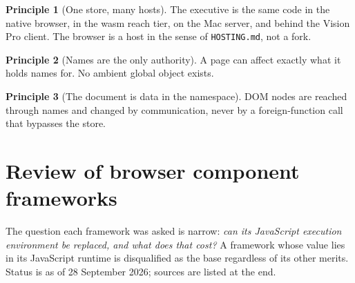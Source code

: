 \documentclass[11pt]{article}
\theoremstyle{definition}
\newtheorem{principle}{Principle}
\theoremstyle{remark}
\newcommand{\code}[1]{\texttt{#1}}
\begin{document}
\begin{principle}[One store, many hosts]
The executive is the same code in the native browser, in the wasm reach tier, on the
Mac server, and behind the Vision Pro client. The browser is a host in the sense of
\code{HOSTING.md}, not a fork.
\end{principle}

\begin{principle}[Names are the only authority]
A page can affect exactly what it holds names for. No ambient global object exists.
\end{principle}

\begin{principle}[The document is data in the namespace]
DOM nodes are reached through names and changed by communication, never by a
foreign-function call that bypasses the store.
\end{principle}

\section{Review of browser component frameworks}\label{sec:review}

The question each framework was asked is narrow: \emph{can its JavaScript execution
environment be replaced, and what does that cost?} A framework whose value lies in
its JavaScript runtime is disqualified as the base regardless of its other merits.
Status is as of 28 September 2026; sources are listed at the end.
\end{document}
